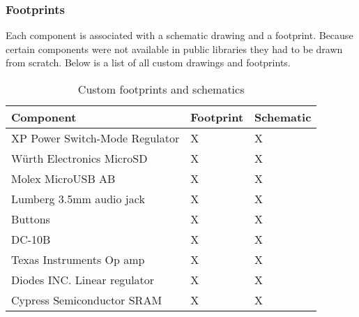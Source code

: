 \subsubsection{Footprints}

Each component is associated with a schematic drawing and a footprint. Because certain components were not available in public libraries they had to be drawn from scratch. Below is a list of all custom drawings and footprints.

\begin{table}[h]
	\centering
	\begin{tabular}{|l l l|}
		\hline
		\textbf{Component} & \textbf{Footprint}  & \textbf{Schematic} \\
		\hline
		XP Power Switch-Mode Regulator & X & X \\
		Würth Electronics MicroSD & X & X \\
		Molex MicroUSB AB & X & X \\
		Lumberg 3.5mm audio jack & X & X \\
		Buttons & X & X \\
		DC-10B & X & X \\
		Texas Instruments Op amp & X & X \\
		Diodes INC. Linear regulator& X & X \\
		Cypress Semiconductor SRAM & X & X \\
		\hline
	\end{tabular}
	\caption{Custom footprints and schematics}
	\label{tab:footprints}
\end{table}

